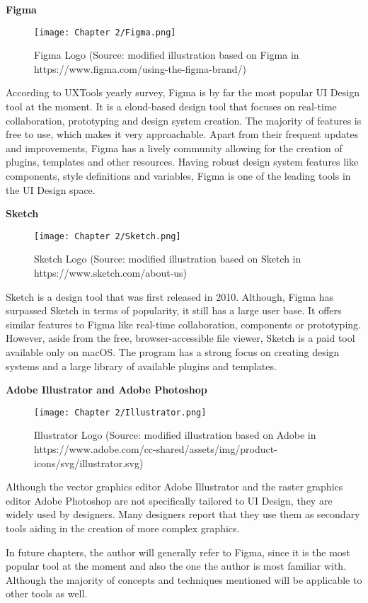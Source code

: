 \textbf{Figma}\\
\begin{figure}[H]
    \texttt{[image: Chapter 2/Figma.png]}
    \caption{Figma Logo (Source: modified illustration based on Figma in https://www.figma.com/using-the-figma-brand/)}
\end{figure}
According to UXTools yearly survey, Figma is by far the most popular UI Design tool at the moment.
 It is a cloud-based design tool that focuses on real-time
collaboration, prototyping and design system creation. The majority of features is free to use,
which makes it very approachable. Apart from their frequent updates and improvements, Figma has a
lively community allowing for the creation of plugins, templates and other resources. Having robust
design system features like components, style definitions and variables, Figma is one of the leading
tools in the UI Design space. 

\textbf{Sketch}\\
\begin{figure}[H]
    \texttt{[image: Chapter 2/Sketch.png]}
    \caption{Sketch Logo (Source: modified illustration based on Sketch in https://www.sketch.com/about-us)}
\end{figure}
Sketch is a design tool that was first released in 2010. Although, Figma has surpassed Sketch in
terms of popularity, it still has a large user base. It offers similar features to Figma like
real-time collaboration, components or prototyping. However, aside from the free, browser-accessible
file viewer, Sketch is a paid tool available only on macOS. The program has a strong focus on
creating design systems and a large library of available plugins and templates. 

\textbf{Adobe Illustrator and Adobe Photoshop}\\
\begin{figure}[H]
    \texttt{[image: Chapter 2/Illustrator.png]}
    \caption{Illustrator Logo (Source: modified illustration based on Adobe in https://www.adobe.com/cc-shared/assets/img/product-icons/svg/illustrator.svg)}
\end{figure}
Although the vector graphics editor Adobe Illustrator and the raster graphics editor Adobe Photoshop
are not specifically tailored to UI Design, they are widely used by designers. Many designers report
that they use them as secondary tools aiding in the creation of more complex graphics.

In future chapters, the author will generally refer to Figma, since it is the most popular tool at
the moment and also the one the author is most familiar with. Although the majority of concepts and
techniques mentioned will be applicable to other tools as well.
